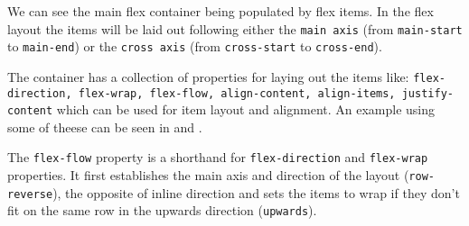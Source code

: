 We can see the main flex container being populated by flex items. In the flex layout the items will be laid out following either the \texttt{main axis} (from \texttt{main-start} to \texttt{main-end}) or the \texttt{cross axis} (from \texttt{cross-start} to \texttt{cross-end}).

The container has a collection of properties for laying out the items like: \texttt{flex-direction, flex-wrap, flex-flow, align-content, align-items, justify-content} which can be used for item layout and alignment. An example using some of theese can be seen in  and .




The \texttt{flex-flow} property is a shorthand for \texttt{flex-direction} and \texttt{flex-wrap} properties. It first establishes the main axis and direction of the layout (\texttt{row-reverse}), the opposite of inline direction and sets the items to wrap if they don't fit on the same row in the upwards direction (\texttt{upwards}).